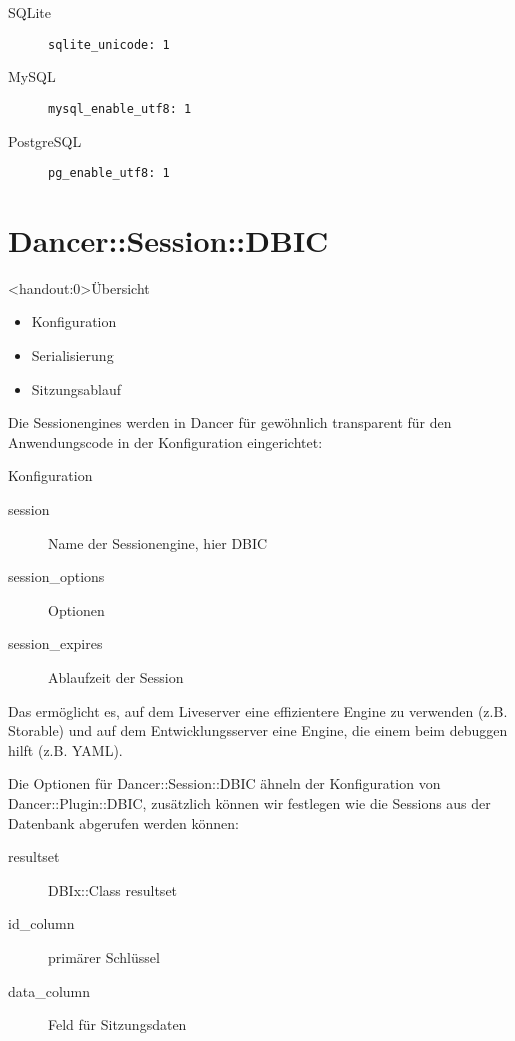 \begin{description}
\item[SQLite] \verb|sqlite_unicode: 1|
\item[MySQL] \verb|mysql_enable_utf8: 1|
\item[PostgreSQL] \verb|pg_enable_utf8: 1| 
\end{description}

\section{Dancer::Session::DBIC}

\begin{frame}<handout:0>{Übersicht}
\begin{itemize}
\item Konfiguration
\item Serialisierung
\item Sitzungsablauf
\end{itemize}
\end{frame}

Die Sessionengines werden in Dancer für gewöhnlich transparent
für den Anwendungscode in der Konfiguration eingerichtet:

\begin{frame}{Konfiguration}
\begin{description}
\item[session] Name der Sessionengine, hier DBIC
\item[session\_options] Optionen
\item[session\_expires] Ablaufzeit der Session
\end{description}
\end{frame}

Das ermöglicht es, auf dem Liveserver eine effizientere Engine
zu verwenden (z.B. Storable) und auf dem Entwicklungsserver
eine Engine, die einem beim debuggen hilft (z.B. YAML).

Die Optionen für Dancer::Session::DBIC ähneln der Konfiguration von
Dancer::Plugin::DBIC, zusätzlich können wir festlegen wie
die Sessions aus der Datenbank abgerufen werden können:

\begin{description}
\item[resultset] DBIx::Class resultset
\item[id\_column] primärer Schlüssel
\item[data\_column] Feld für Sitzungsdaten 
\end{description}

